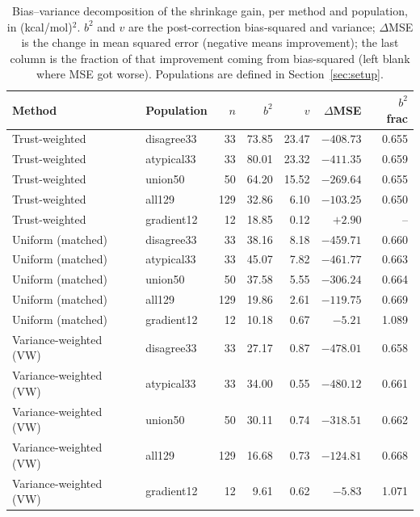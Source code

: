 \documentclass{article}
\begin{document}
\begin{table}[htbp]
  \caption{Bias--variance decomposition of the shrinkage gain, per method and
  population, in (kcal/mol)$^2$. $b^2$ and $v$ are the post-correction
  bias-squared and variance; $\Delta$MSE is the change in mean squared
  error (negative means improvement); the last column is the fraction of
  that improvement coming from bias-squared (left blank where MSE got
  worse). Populations are defined in Section~\ref{sec:setup}.}
  \label{tab:bias-var}
  \centering
  \renewcommand{\arraystretch}{1.30}
  \small
  \setlength{\tabcolsep}{11pt}
  \begin{tabular}{ll@{\hspace{6pt}}rrrrr}
    \toprule
    Method & Population & $n$ & $b^2$ & $v$ & $\Delta$MSE & $b^2$ frac \\
    \midrule
    Trust-weighted & disagree33 & 33 & 73.85 & 23.47 & $-408.73$ & 0.655 \\
    Trust-weighted & atypical33 & 33 & 80.01 & 23.32 & $-411.35$ & 0.659 \\
    Trust-weighted & union50 & 50 & 64.20 & 15.52 & $-269.64$ & 0.655 \\
    Trust-weighted & all129 & 129 & 32.86 & 6.10 & $-103.25$ & 0.650 \\
    Trust-weighted & gradient12 & 12 & 18.85 & 0.12 & $+2.90$ & -- \\
    \midrule
    Uniform (matched) & disagree33 & 33 & 38.16 & 8.18 & $-459.71$ & 0.660 \\
    Uniform (matched) & atypical33 & 33 & 45.07 & 7.82 & $-461.77$ & 0.663 \\
    Uniform (matched) & union50 & 50 & 37.58 & 5.55 & $-306.24$ & 0.664 \\
    Uniform (matched) & all129 & 129 & 19.86 & 2.61 & $-119.75$ & 0.669 \\
    Uniform (matched) & gradient12 & 12 & 10.18 & 0.67 & $-5.21$ & 1.089 \\
    \midrule
    Variance-weighted (VW) & disagree33 & 33 & 27.17 & 0.87 & $-478.01$ & 0.658 \\
    Variance-weighted (VW) & atypical33 & 33 & 34.00 & 0.55 & $-480.12$ & 0.661 \\
    Variance-weighted (VW) & union50 & 50 & 30.11 & 0.74 & $-318.51$ & 0.662 \\
    Variance-weighted (VW) & all129 & 129 & 16.68 & 0.73 & $-124.81$ & 0.668 \\
    Variance-weighted (VW) & gradient12 & 12 & 9.61 & 0.62 & $-5.83$ & 1.071 \\

\end{tabular}
\end{table}
\end{document}
